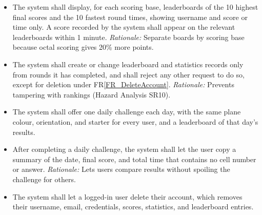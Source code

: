 \documentclass[12pt]{article}
\newcounter{reqnum} %
\newcommand{\rref}[1]{FR\ref{#1}}
\begin{document}
\begin{itemize}
\item[FR\refstepcounter{reqnum}\thereqnum \label{FR_Leaderboards}:] The system shall display, for each scoring base, leaderboards of the 10 highest final scores and the 10 fastest round times, showing username and score or time only. A score recorded by the system shall appear on the relevant leaderboards within 1 minute. \newline \textit{Rationale:} Separate boards by scoring base because octal scoring gives 20\% more points.
 
\item[FR\refstepcounter{reqnum}\thereqnum \label{FR_LeaderboardIntegrity}:] The system shall create or change leaderboard and statistics records only from rounds it has completed, and shall reject any other request to do so, except for deletion under \rref{FR_DeleteAccount}. \newline \textit{Rationale:} Prevents tampering with rankings (Hazard Analysis SR10).
 
\item[FR\refstepcounter{reqnum}\thereqnum \label{FR_DailyChallenge}:] The system shall offer one daily challenge each day, with the same plane colour, orientation, and starter for every user, and a leaderboard of that day's results.
 
\item[FR\refstepcounter{reqnum}\thereqnum \label{FR_ShareResults}:] After completing a daily challenge, the system shall let the user copy a summary of the date, final score, and total time that contains no cell number or answer. \newline \textit{Rationale:} Lets users compare results without spoiling the challenge for others.
 
\item[FR\refstepcounter{reqnum}\thereqnum \label{FR_DeleteAccount}:] The system shall let a logged-in user delete their account, which removes their username, email, credentials, scores, statistics, and leaderboard entries.
 
\end{itemize}
 
\end{document}
